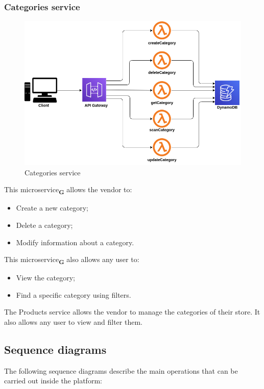 \subsubsection{Categories service}
\begin{figure}[!h]
    \vspace{5px}
    \includegraphics[scale=0.5]{../../../../Images/Diagrammi/maintainerManual/categoriesService.png}
    \centering
    \caption{Categories service}
\end{figure}
This microservice\textsubscript{\textbf{G}} allows the vendor to:
\begin{itemize}
    \item Create a new category;
    \item Delete a category;
    \item Modify information about a category.
\end{itemize}
This microservice\textsubscript{\textbf{G}} also allows any user to:
\begin{itemize}
    \item View the category;
    \item Find a specific category using filters.
\end{itemize}
The Products service allows the vendor to manage the categories of their store. It also allows any user to view and filter them.

\pagebreak
\subsection{Sequence diagrams}
The following sequence diagrams describe the main operations that can be carried out inside the platform:
